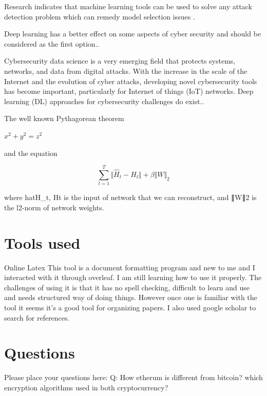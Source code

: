 \documentclass{article}
\begin{document}
Research indicates that machine learning tools can be used to solve any attack detection problem which can remedy model selection issues \cite{berghout2022machine}.

Deep learning has a better effect on some aspects of cyber security and should be considered as the first option.\cite{li2021deep}.

Cybersecurity data science is a very emerging field that protects systems, networks, and data from digital attacks. With the increase in the scale of the Internet and the evolution of cyber attacks, developing novel cybersecurity tools has become important, particularly for Internet of things (IoT) networks. Deep learning (DL) approaches for cybersecurity challenges do exist.\cite{podder2021artificial}.
\par
 \doublespacing
The well known Pythagorean theorem \par \(x^2 + y^2 = z^2\) \par and the equation \par
 \doublespacing
\begin{equation*} \sum _{t=1}^{T}\Vert {\hat{H}_t-H_t}\Vert +\beta \Vert W\Vert _2 \tag{11} \end{equation*}

where hat{H}_t, Ht  is the input of network that we can reconstruct, and ∥W∥2 is the l2-norm of network weights.

\nocite{jain2004introduction}
\nocite{yu2003ga}
\nocite{roy2018protection}
\nocite{zhang2021research}
\nocite{lecun2015deep}
\nocite{bai2021know}
\nocite{yu2021information}
\nocite{xu2018industry}
\nocite{culot2019addressing}
\nocite{meneghello2019iot}
\nocite{wang2019blockchain}
\nocite{falco2018iiot}
\nocite{pan2015classification}
\nocite{zhang2003data}
\nocite{demertzis2018next}
\nocite{hao2016mining}
\nocite{zhao2019blockchain}
\nocite{gurdgiev2021informational}
\nocite{jain2004introduction}
\nocite{podder2021artificial}

\medskip

\section{Tools used}
Online Latex
This tool is a document formatting program and new to me and I interacted with it through overleaf. I am still learning how to use it properly. The challenges of using it is that it has no spell checking, difficult to learn and use and  needs structured way of doing things. However once one is familiar with the tool it seems it's a good tool for organizing papers. I also used google scholar to search for references. 


\section{Questions}
Please place your questions here:
Q: How etherum is different from bitcoin? which encryption algorithms used in both cryptocurrency?

\printbibliography
\end{document}

